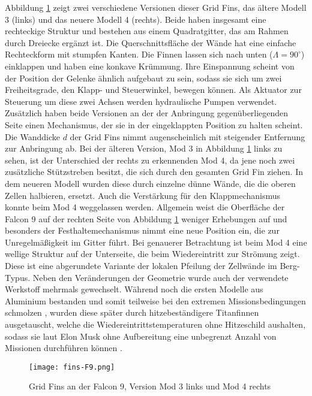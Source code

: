 Abbildung \ref{abb_finsF9} zeigt zwei verschiedene Versionen dieser Grid Fins, das ältere Modell 3 (links) und das neuere Modell 4 (rechts). Beide haben insgesamt eine rechteckige Struktur und bestehen aus einem Quadratgitter, das am Rahmen durch Dreiecke ergänzt ist. Die Querschnittsfläche der Wände hat eine einfache Rechteckform mit stumpfen Kanten. Die Finnen lassen sich nach unten ($\Lambda = 90^\circ$) einklappen und haben eine konkave Krümmung. Ihre Einspannung scheint von der Position der Gelenke ähnlich aufgebaut zu sein, sodass sie sich um zwei Freiheitsgrade, den Klapp- und Steuerwinkel, bewegen können. Als Aktuator zur Steuerung um diese zwei Achsen werden hydraulische Pumpen verwendet. Zusätzlich haben beide Versionen an der der Anbringung gegenüberliegenden Seite einen Mechanismus, der sie in der eingeklappten Position zu halten scheint. Die Wanddicke $d$ der Grid Fins nimmt augenscheinlich mit steigender Entfernung zur Anbringung ab. Bei der älteren Version, Mod 3 in Abbildung \ref{abb_finsF9} links zu sehen, ist der Unterschied der rechts zu erkennenden Mod 4, da jene noch zwei zusätzliche Stützstreben besitzt, die sich durch den gesamten Grid Fin ziehen. In dem neueren Modell wurden diese durch einzelne dünne Wände, die die oberen Zellen halbieren, ersetzt. Auch die Verstärkung für den Klappmechanismus konnte beim Mod 4 weggelassen werden. Allgemein weist die Oberfläche der Falcon 9 auf der rechten Seite von Abbildung \ref{abb_finsF9} weniger Erhebungen auf und besonders der Festhaltemechanismus nimmt eine neue Position ein, die zur Unregelmäßigkeit im Gitter führt. Bei genauerer Betrachtung ist beim Mod 4 eine wellige Struktur auf der Unterseite, die beim Wiedereintritt zur Strömung zeigt. Diese ist eine abgerundete Variante der lokalen Pfeilung der Zellwände im Berg-Typus. Neben den Veränderungen der Geometrie wurde auch der verwendete Werkstoff mehrmals gewechselt. Während noch die ersten Modelle aus Aluminium bestanden und somit teilweise bei den extremen Missionsbedingungen schmolzen \cite{titanium}, wurden diese später durch hitzebeständigere Titanfinnen ausgetauscht, welche die Wiedereintrittstemperaturen ohne Hitzeschild aushalten, sodass sie laut Elon Musk ohne Aufbereitung eine unbegrenzt Anzahl von Missionen durchführen können \cite{titanium}.
\begin{figure}[h]
	\centering
	\texttt{[image: fins-F9.png]}
	\begin{flushright}
	\end{flushright}
	\caption{Grid Fins an der Falcon 9, Version Mod 3 links und Mod 4 rechts}
	\label{abb_finsF9}
\end{figure}\\
